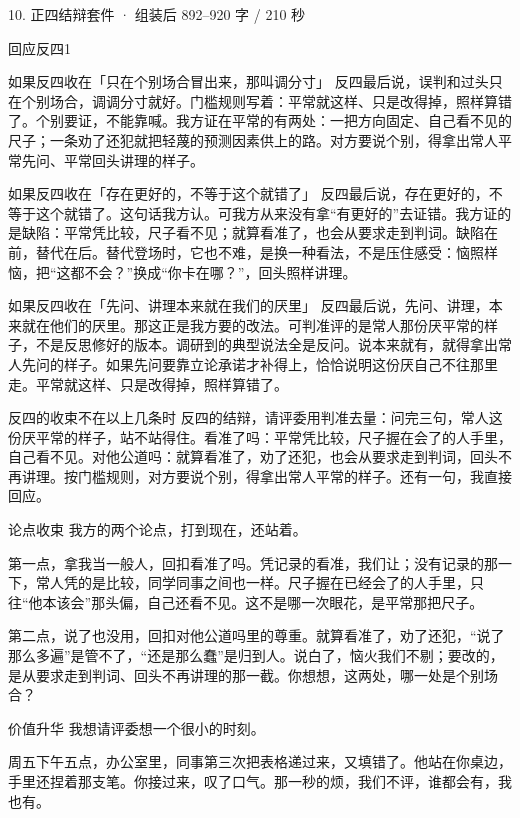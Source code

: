 \documentclass[script,pro]{debate}
\begin{document}
\begin{kit}{10. 正四结辩}{套件 · 组装后 892–920 字 / 210 秒}
\begin{pick}{回应反四}{1}
\begin{module}{如果反四收在「只在个别场合冒出来，那叫调分寸」}
反四最后说，误判和过头只在个别场合，调调分寸就好。门槛规则写着：平常就这样、只是改得掉，照样算错了。个别要证，不能靠喊。我方证在平常的有两处：一把方向固定、自己看不见的尺子；一条劝了还犯就把轻蔑的预测因素供上的路。对方要说个别，得拿出常人平常先问、平常回头讲理的样子。
\end{module}
\begin{module}{如果反四收在「存在更好的，不等于这个就错了」}
反四最后说，存在更好的，不等于这个就错了。这句话我方认。可我方从来没有拿“有更好的”去证错。我方证的是缺陷：平常凭比较，尺子看不见；就算看准了，也会从要求走到判词。缺陷在前，替代在后。替代登场时，它也不难，是换一种看法，不是压住感受：恼照样恼，把“这都不会？”换成“你卡在哪？”，回头照样讲理。
\end{module}
\begin{module}{如果反四收在「先问、讲理本来就在我们的厌里」}
反四最后说，先问、讲理，本来就在他们的厌里。那这正是我方要的改法。可判准评的是常人那份厌平常的样子，不是反思修好的版本。调研到的典型说法全是反问。说本来就有，就得拿出常人先问的样子。如果先问要靠立论承诺才补得上，恰恰说明这份厌自己不往那里走。平常就这样、只是改得掉，照样算错了。
\end{module}
\begin{fallback}{反四的收束不在以上几条时}
反四的结辩，请评委用判准去量：问完三句，常人这份厌平常的样子，站不站得住。看准了吗：平常凭比较，尺子握在会了的人手里，自己看不见。对他公道吗：就算看准了，劝了还犯，也会从要求走到判词，回头不再讲理。按门槛规则，对方要说个别，得拿出常人平常的样子。还有一句，我直接回应。
\end{fallback}
\end{pick}
\begin{fixed}{论点收束}
我方的两个论点，打到现在，还站着。

第一点，拿我当一般人，回扣看准了吗。凭记录的看准，我们让；没有记录的那一下，常人凭的是比较，同学同事之间也一样。尺子握在已经会了的人手里，只往“他本该会”那头偏，自己还看不见。这不是哪一次眼花，是平常那把尺子。

第二点，说了也没用，回扣对他公道吗里的尊重。就算看准了，劝了还犯，“说了那么多遍”是管不了，“还是那么蠢”是归到人。说白了，恼火我们不剔；要改的，是从要求走到判词、回头不再讲理的那一截。你想想，这两处，哪一处是个别场合？
\end{fixed}
\begin{fixed}{价值升华}
我想请评委想一个很小的时刻。

周五下午五点，办公室里，同事第三次把表格递过来，又填错了。他站在你桌边，手里还捏着那支笔。你接过来，叹了口气。那一秒的烦，我们不评，谁都会有，我也有。


\end{fixed}
\end{kit}
\end{document}
